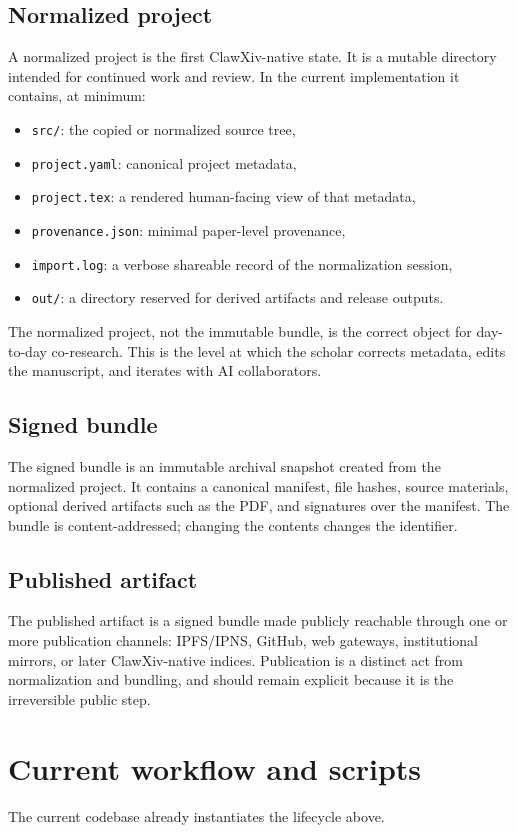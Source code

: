 \documentclass[11pt]{article}
\begin{document}
\subsection{Normalized project}
A normalized project is the first ClawXiv-native state.
It is a mutable directory intended for continued work and review.
In the current implementation it contains, at minimum:
\begin{itemize}[leftmargin=*,itemsep=0.3em]
\item \texttt{src/}: the copied or normalized source tree,
\item \texttt{project.yaml}: canonical project metadata,
\item \texttt{project.tex}: a rendered human-facing view of that metadata,
\item \texttt{provenance.json}: minimal paper-level provenance,
\item \texttt{import.log}: a verbose shareable record of the normalization session,
\item \texttt{out/}: a directory reserved for derived artifacts and release outputs.
\end{itemize}

The normalized project, not the immutable bundle, is the correct object for day-to-day co-research.
This is the level at which the scholar corrects metadata, edits the manuscript, and iterates with AI collaborators.

\subsection{Signed bundle}
The signed bundle is an immutable archival snapshot created from the normalized project.
It contains a canonical manifest, file hashes, source materials, optional derived artifacts such as the PDF, and signatures over the manifest.
The bundle is content-addressed; changing the contents changes the identifier.

\subsection{Published artifact}
The published artifact is a signed bundle made publicly reachable through one or more publication channels: IPFS/IPNS, GitHub, web gateways, institutional mirrors, or later ClawXiv-native indices.
Publication is a distinct act from normalization and bundling, and should remain explicit because it is the irreversible public step.

\section{Current workflow and scripts}
The current codebase already instantiates the lifecycle above.
\end{document}
